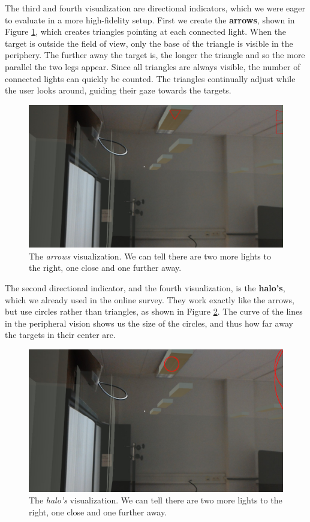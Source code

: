 The third and fourth visualization are directional indicators, which we were eager to evaluate in a more high-fidelity setup. First we create the \textbf{arrows}, shown in Figure \ref{fig:arrows_vis}, which creates triangles pointing at each connected light. When the target is outside the field of view, only the base of the triangle is visible in the periphery. The further away the target is, the longer the triangle and so the more parallel the two legs appear. Since all triangles are always visible, the number of connected lights can quickly be counted. The triangles continually adjust while the user looks around, guiding their gaze towards the targets.

\begin{figure}
    \centering
    \includegraphics[width=1.0\linewidth]{resources/implementation/arrows.jpg}
    \caption{The \textit{arrows} visualization. We can tell there are two more lights to the right, one close and one further away.}
    \label{fig:arrows_vis}
\end{figure}

The second directional indicator, and the fourth visualization, is the \textbf{halo's}, which we already used in the online survey. They work exactly like the arrows, but use circles rather than triangles, as shown in Figure \ref{fig:halos_vis}. The curve of the lines in the peripheral vision shows us the size of the circles, and thus how far away the targets in their center are.

\begin{figure}
    \centering
    \includegraphics[width=1.0\linewidth]{resources/implementation/halos.jpg}
    \caption{The \textit{halo's} visualization. We can tell there are two more lights to the right, one close and one further away.}
    \label{fig:halos_vis}
\end{figure}

